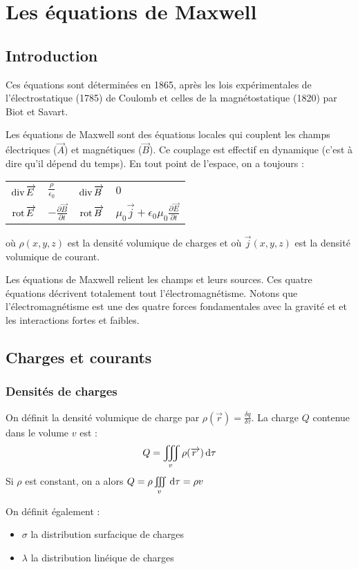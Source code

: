 \chapter{Les équations de Maxwell}
\section{Introduction}

Ces équations sont déterminées en 1865, après les lois expérimentales de l'électrostatique (1785) de Coulomb et celles de la magnétostatique (1820) par Biot et Savart.

Les équations de Maxwell sont des équations locales qui couplent les champs électriques ($\vec{A}$) et magnétiques ($\vec{B}$). Ce couplage est effectif en dynamique (c'est à dire qu'il dépend du temps). En tout point de l'espace, on a toujours :
\begin{center}
	\begin{tabular}{r @{=} lr @{=} l}
	$\operatorname{div} \overrightarrow{E\:}$&$\frac{\rho}{\epsilon_0}$ & $\operatorname{div} \overrightarrow{B\:}$&$0$\\
	$\operatorname{rot} \overrightarrow{E\:}$&$-\frac{\partial\vec{B}}{\partial t}$ & $\operatorname{rot} \overrightarrow{B\:}$&$\mu_0\vec{j}+\epsilon_0\mu_0\frac{\partial\vec{E}}{\partial t}$
	\end{tabular}
\end{center}
où $\rho(x,y,z)$ est la densité volumique de charges et où $\vec{j}(x,y,z)$ est la densité volumique de courant.

Les équations de Maxwell relient les champs et leurs sources. Ces quatre équations décrivent totalement tout l'électromagnétisme. Notons que l'électromagnétisme est une des quatre forces fondamentales avec la gravité et et les interactions fortes et faibles.

\section{Charges et courants}
\subsection{Densités de charges}

On définit la densité volumique de charge par $\rho(\vec{r})=\frac{\delta q}{\delta\tau}$. La charge $Q$ contenue dans le volume $v$ est :
\[
	Q=\iiint\limits_{v}\rho(\overrightarrow{r\:}) \,\mathrm{d}\tau
\]
Si $\rho$ est constant, on a alors $Q=\rho\iiint\limits_v\,\mathrm{d}\tau = \rho v$ 

On définit également :
\begin{itemize}
	\item $\sigma$ la distribution surfacique de charges
	\item $\lambda$ la distribution linéique de charges
\end{itemize}
